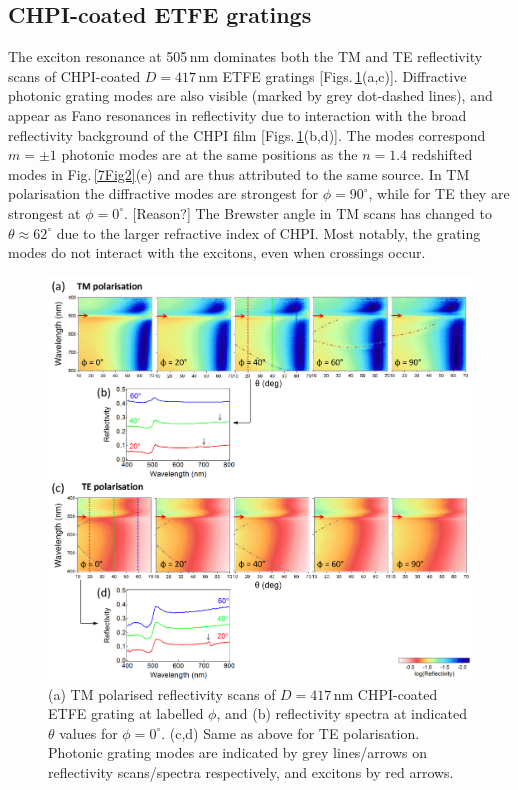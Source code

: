 \subsection{CHPI-coated ETFE gratings}
The exciton resonance at 505\,nm dominates both the TM and TE reflectivity scans of CHPI-coated $D=417$\,nm ETFE gratings [Figs.\,\ref{7Fig3}(a,c)]. Diffractive photonic grating modes are also visible (marked by grey dot-dashed lines), and appear as Fano resonances in reflectivity due to interaction with the broad reflectivity background of the CHPI film [Figs.\,\ref{7Fig3}(b,d)]. The modes correspond $m=\pm1$ photonic modes are at the same positions as the $n=1.4$ redshifted modes in Fig.\,\ref{7Fig2}(e) and are thus attributed to the same source. In TM polarisation the diffractive modes are strongest for $\phi=90^{\circ}$, while for TE they are strongest at $\phi=0^{\circ}$. [Reason?] The Brewster angle in TM scans has changed to $\theta\approx62^{\circ}$ due to the larger refractive index of CHPI. Most notably, the grating modes do not interact with the excitons, even when crossings occur.
\begin{figure}[ht] 
\centering    
\includegraphics[width=\textwidth]{Fig3}
\caption{(a) TM polarised reflectivity scans of $D=417$\,nm CHPI-coated ETFE grating at labelled $\phi$, and (b) reflectivity spectra at indicated $\theta$ values for $\phi=0^{\circ}$. (c,d) Same as above for TE polarisation. Photonic grating modes are indicated by grey lines/arrows on reflectivity scans/spectra respectively, and excitons by red arrows.}
\label{7Fig3}
\end{figure}

